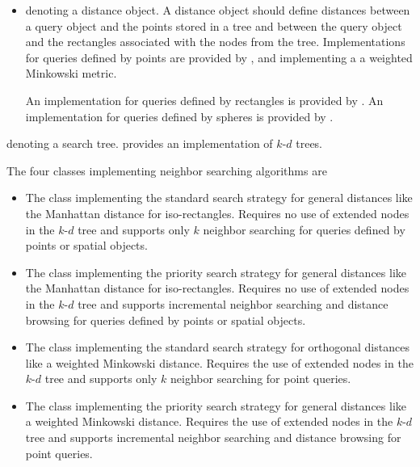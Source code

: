 \begin{itemize}
\item
{} denoting a distance object. A distance object should define distances between a query object
and the points stored in a tree and between the query object and the rectangles associated with the nodes from the tree.
Implementations for queries defined by points are provided
by , and
 implementing a 
a weighted Minkowski metric.

An implementation for queries defined by rectangles is provided by
.
An implementation for queries defined by spheres is provided by
.

\end{itemize}
 denoting a search tree.  
 provides an implementation of $k$-$d$ trees.

The four classes implementing neighbor searching algorithms are

\begin{itemize}

\item
The class  
implementing the standard search strategy for general distances
like the Manhattan distance for iso-rectangles.
Requires no use of extended nodes in the $k$-$d$ tree and supports only $k$
neighbor searching for queries defined by points or spatial objects.


\item
The class  implementing the priority search 
strategy for general distances
like the Manhattan distance for iso-rectangles.
Requires no use of extended nodes in the $k$-$d$ tree and supports incremental
neighbor searching and distance browsing for queries defined by points or spatial objects.

\item
The class  implementing the standard search strategy for 
orthogonal distances
like a weighted Minkowski distance. Requires the use of extended nodes in the $k$-$d$ tree and supports 
only $k$ neighbor searching for point queries.

\item
The class  implementing the priority search strategy for general 
distances
like a weighted Minkowski distance. Requires the use of extended nodes in the $k$-$d$ tree and supports incremental
neighbor searching and distance browsing for point queries.

\end{itemize}

